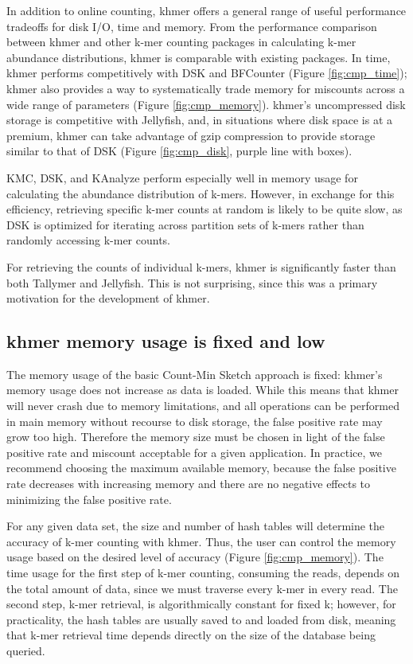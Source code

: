 \documentclass[10pt]{article}
\begin{document}
In addition to online counting, khmer offers a general range of useful
performance tradeoffs for disk I/O, time and memory.  From the
performance comparison between khmer and other k-mer counting packages
in calculating k-mer abundance distributions, khmer is comparable with
existing packages.  In time, khmer performs competitively with DSK and
BFCounter (Figure \ref{fig:cmp_time}); khmer also provides a way to
systematically trade memory for miscounts across a wide range of
parameters (Figure \ref{fig:cmp_memory}).  khmer's uncompressed disk
storage is competitive with Jellyfish, and, in situations where disk
space is at a premium, khmer can take advantage of gzip compression to
provide storage similar to that of DSK (Figure \ref{fig:cmp_disk},
purple line with boxes).

KMC, DSK, and KAnalyze perform especially well in memory usage for
calculating the abundance distribution of k-mers. However, in exchange
for this efficiency, retrieving specific k-mer counts at random is
likely to be quite slow, as DSK is optimized for iterating across
partition sets of k-mers rather than randomly accessing k-mer counts.

For retrieving the counts of individual k-mers, khmer is significantly
faster than both Tallymer and Jellyfish.  This is not surprising,
since this was a primary motivation for the development of khmer.

\subsection*{khmer memory usage is fixed and low}

The memory usage of the basic Count-Min Sketch approach is fixed:
khmer's memory usage does not increase as data is loaded. While this
means that khmer will never crash due to memory limitations, and all
operations can be performed in main memory without recourse to disk
storage, the false positive rate may grow too high.  Therefore the
memory size must be chosen in light of the false positive rate and
miscount acceptable for a given application.  In practice, we
recommend choosing the maximum available memory, because the false
positive rate decreases with increasing memory and there are no
negative effects to minimizing the false positive rate.

For any given data set, the size and number of hash tables will
determine the accuracy of k-mer counting with khmer.  Thus, the user
can control the memory usage based on the desired level of accuracy
(Figure \ref{fig:cmp_memory}). The time usage for the first step of
k-mer counting, consuming the reads, depends on the total amount of
data, since we must traverse every k-mer in every read.  The second
step, k-mer retrieval, is algorithmically constant for fixed k;
however, for practicality, the hash tables are usually saved to and
loaded from disk, meaning that k-mer retrieval time depends directly
on the size of the database being queried.
\end{document}
